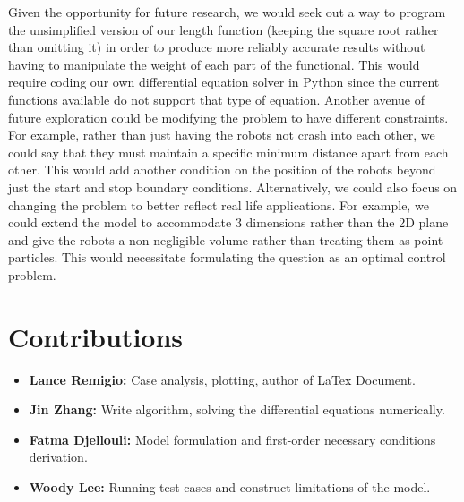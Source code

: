 Given the opportunity for future research, we would seek out a way to program the unsimplified version of our length function (keeping the square root rather than omitting it) in order to produce more reliably accurate results without having to manipulate the weight of each part of the functional. This would require coding our own differential equation solver in Python since the current functions available do not support that type of equation. Another avenue of future exploration could be modifying the problem to have different constraints. For example, rather than just having the robots not crash into each other, we could say that they must maintain a specific minimum distance apart from each other. This would add another condition on the position of the robots beyond just the start and stop boundary conditions. Alternatively, we could also focus on changing the problem to better reflect real life applications. For example, we could extend the model to accommodate 3 dimensions rather than the 2D plane and give the robots a non-negligible volume rather than treating them as point particles. This would necessitate formulating the question as an optimal control problem. 



\section{Contributions}
\begin{itemize}
    \item \textbf{Lance Remigio:} Case analysis, plotting, author of LaTex Document.
    \item \textbf{Jin Zhang:} Write algorithm, solving the differential equations numerically.
    \item \textbf{Fatma Djellouli:} Model formulation and first-order necessary conditions derivation.
    \item \textbf{Woody Lee:} Running test cases and construct limitations of the model. 
\end{itemize}
